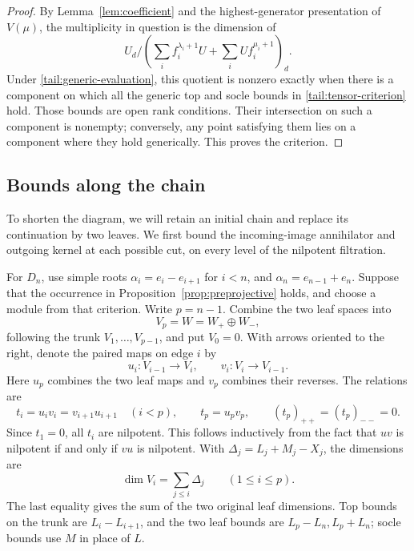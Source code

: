 \begin{proof}
By Lemma~\ref{lem:coefficient} and the highest-generator presentation
of \(V(\mu)\), the multiplicity in question is the dimension of
\begin{equation}\label{tail:double-quotient}
 U_d\Big/
 \left(
   \sum_i f_i^{\lambda_i+1}U+
   \sum_i U f_i^{\mu_i+1}
 \right)_d .
\end{equation}
Under \eqref{tail:generic-evaluation}, this quotient is nonzero
exactly when there is a component on which all the generic top and
socle bounds in \eqref{tail:tensor-criterion} hold.  Those bounds are
open rank conditions.  Their intersection on such a component is
nonempty; conversely, any point satisfying them lies on a component
where they hold generically.  This proves the criterion.
\end{proof}

\subsection{Bounds along the chain}

To shorten the diagram, we will retain an initial chain and replace
its continuation by two leaves. We first bound
the incoming-image annihilator and outgoing kernel at each possible
cut, on every level of the nilpotent filtration.

For \(D_n\), use simple roots
\(\alpha_i=e_i-e_{i+1}\) for \(i<n\), and
\(\alpha_n=e_{n-1}+e_n\).
Suppose that the occurrence in
Proposition~\ref{prop:preprojective} holds, and choose a module from
that criterion. Write \(p=n-1\).
Combine the two leaf spaces into
\[
 V_p=W=W_+\oplus W_-,
\]
following the trunk \(V_1,\ldots,V_{p-1}\), and put \(V_0=0\).
With arrows oriented to the right, denote the paired maps on edge
\(i\) by
\[
 u_i:V_{i-1}\longrightarrow V_i,\qquad
 v_i:V_i\longrightarrow V_{i-1}.
\]
Here \(u_p\) combines the two leaf maps and \(v_p\) combines their
reverses.  The relations are
\begin{equation}\label{tail:chain-relations}
 t_i=u_iv_i=v_{i+1}u_{i+1}\quad(i<p),\qquad
 t_p=u_pv_p,\qquad
 (t_p)_{++}=(t_p)_{--}=0 .
\end{equation}
Since \(t_1=0\), all \(t_i\) are nilpotent.  This follows inductively
from the fact that \(uv\) is nilpotent if and only if \(vu\) is
nilpotent.  With \(\Delta_j=L_j+M_j-X_j\), the dimensions are
\begin{equation}\label{tail:chain-dimensions}
 \dim V_i=\sum_{j\le i}\Delta_j\qquad(1\le i\le p).
\end{equation}
The last equality gives the sum of the two original leaf dimensions.
Top bounds on the trunk are \(L_i-L_{i+1}\), and the two leaf bounds
are \(L_p-L_n,L_p+L_n\); socle bounds use \(M\) in place of \(L\).

